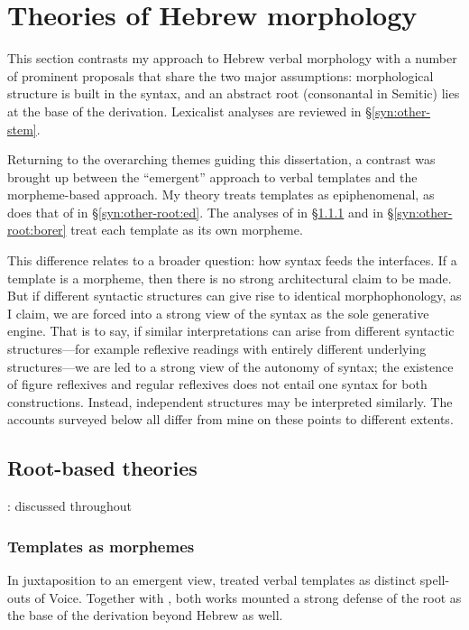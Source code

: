 \section{Theories of Hebrew morphology}

This section contrasts my approach to Hebrew verbal morphology with a number of prominent proposals that share the two major assumptions: morphological structure is built in the syntax, and an abstract root (consonantal in Semitic) lies at the base of the derivation. Lexicalist analyses are reviewed in \S\ref{syn:other-stem}. 

Returning to the overarching themes guiding this dissertation, a contrast was brought up between the ``emergent'' approach to verbal templates and the morpheme-based approach. My theory treats templates as epiphenomenal, as does that of \cite{doron03} in \S\ref{syn:other-root:ed}. The analyses of \cite{arad05} in \S\ref{syn:other-root:arad} and \cite{borer13oup} in \S\ref{syn:other-root:borer} treat each template as its own morpheme.

This difference relates to a broader question: how syntax feeds the interfaces. If a template is a morpheme, then there is no strong architectural claim to be made. But if different syntactic structures can give rise to identical morphophonology, as I claim, we are forced into a strong view of the syntax as the sole generative engine. That is to say, if similar interpretations can arise from different syntactic structures---for example reflexive readings with entirely different underlying structures---we are led to a strong view of the autonomy of syntax; the existence of figure reflexives and regular reflexives does not entail one syntax for both constructions. Instead, independent structures may be interpreted similarly. The accounts surveyed below all differ from mine on these points to different extents.


	\subsection{Root-based theories}
	\cite{doron03,doron14}: discussed throughout

		\subsubsection{Templates as morphemes \citep{arad05}} \label{syn:other-root:arad}
In juxtaposition to an emergent view, \cite{arad05} treated verbal templates as distinct spell-outs of Voice. Together with \cite{arad03}, both works mounted a strong defense of the root as the base of the derivation beyond Hebrew as well.

